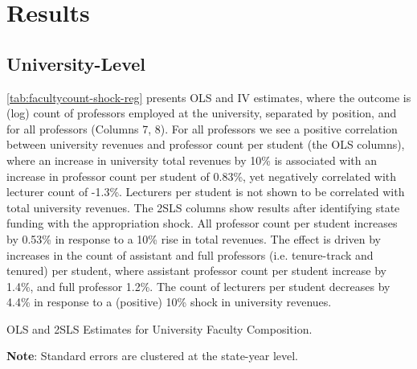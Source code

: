 \documentclass[notitlepage,12pt]{article}
\begin{document}
\section{Results}
\label{sec:results}

\subsection{University-Level}

\autoref{tab:facultycount-shock-reg} presents OLS and IV estimates, where the outcome is (log) count of professors employed at the university, separated by position, and for all professors (Columns 7, 8).
For all professors we see a positive correlation between university revenues and professor count per student (the OLS columns), where an increase in university total revenues by 10\% is associated with an increase in professor count per student of 0.83\%, yet negatively correlated with lecturer count of -1.3\%.
Lecturers per student is not shown to be correlated with total university revenues.
The 2SLS columns show results after identifying state funding with the appropriation shock.
All professor count per student increases by 0.53\% in response to a 10\% rise in total revenues.
The effect is driven by increases in the count of assistant and full professors (i.e. tenure-track and tenured) per student, where assistant professor count per student increase by 1.4\%, and full professor 1.2\%.
The count of lecturers per student decreases by 4.4\% in response to a (positive) 10\% shock in university revenues.

\begin{table}[h!]
    \singlespacing
    \centering
    \caption{OLS and 2SLS Estimates for University Faculty Composition.}
    \makebox[\textwidth][c]{}
    \begin{flushleft}
        \footnotesize
        \textbf{Note}: Standard errors are clustered at the state-year level.
    \end{flushleft}
    \label{tab:facultycount-shock-reg}
\end{table}
\end{document}
